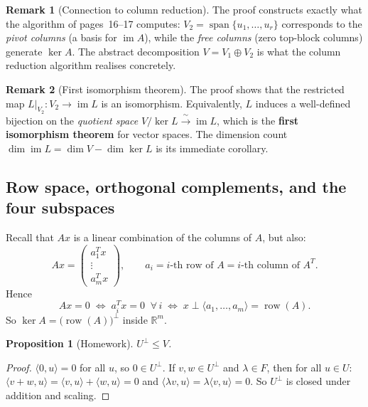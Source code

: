 \documentclass[11pt]{article}
\theoremstyle{definition}
\newtheorem{remark}{Remark}[section]
\theoremstyle{plain}
\newtheorem{proposition}{Proposition}[section]
\begin{document}
\begin{remark}[Connection to column reduction]
  The proof constructs exactly what the algorithm of pages~16--17 computes:
  $V_2 = \operatorname{span}\{u_1,\ldots,u_r\}$ corresponds to the
  \emph{pivot columns} (a basis for $\operatorname{im}A$), while the
  \emph{free columns} (zero top-block columns) generate $\ker A$.
  The abstract decomposition $V = V_1 \oplus V_2$ is what the column
  reduction algorithm realises concretely.
\end{remark}

\begin{remark}[First isomorphism theorem]
  The proof shows that the restricted map
  $L|_{V_2} : V_2 \to \operatorname{im}L$ is an isomorphism.
  Equivalently, $L$ induces a well-defined bijection on the
  \emph{quotient space} $V/\ker L \xrightarrow{\;\sim\;} \operatorname{im}L$,
  which is the \textbf{first isomorphism theorem} for vector spaces.
  The dimension count $\dim\operatorname{im}L = \dim V - \dim\ker L$ is
  its immediate corollary.
\end{remark}

\subsection{Row space, orthogonal complements, and the four subspaces}

Recall that $Ax$ is a linear combination of the columns of $A$, but also:
\[
  Ax = \begin{pmatrix}a_1^T x\\\vdots\\a_m^T x\end{pmatrix},
  \qquad a_i = i\text{-th row of }A = i\text{-th column of }A^T.
\]
Hence
\[
  Ax = 0
  \;\Longleftrightarrow\;
  a_i^T x = 0\;\;\forall\,i
  \;\Longleftrightarrow\;
  x \perp \langle a_1,\ldots,a_m\rangle = \operatorname{row}(A).
\]
So $\ker A = \bigl(\operatorname{row}(A)\bigr)^\perp$ inside $\mathbb{R}^m$.

\begin{proposition}[Homework]
  $U^\perp \leq V$.
\end{proposition}
\begin{proof}
  $\langle 0, u\rangle = 0$ for all $u$, so $0 \in U^\perp$.
  If $v,w \in U^\perp$ and $\lambda \in F$, then for all $u \in U$:
  $\langle v+w, u\rangle = \langle v,u\rangle + \langle w,u\rangle = 0$
  and $\langle \lambda v, u\rangle = \lambda\langle v,u\rangle = 0$.
  So $U^\perp$ is closed under addition and scaling.
\end{proof}
\end{document}

